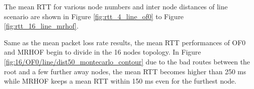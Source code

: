 The mean RTT for various node numbers and inter node distances of line scenario are shown in Figure \ref{fig:rtt_4_line_of0} to Figure \ref{fig:rtt_16_line_mrhof}.
\newline

Same as the mean packet loss rate results, the mean RTT performances of OF0 and MRHOF begin to divide in the 16 nodes topology. In Figure \ref{fig:16/OF0/line/dist50_montecarlo_contour} due to the bad routes between the root and a few further away nodes, the mean RTT becomes higher than 250 ms while MRHOF keeps a mean RTT within 150 ms even for the furthest node.
    
\begin{figure}[htbp]
  \centering
    \leavevmode
     \subfloat[100 m]{\label{fig:4/OF0/line/dist100_montecarlo_contour}
      \hspace{-30pt}
}
\end{figure}
